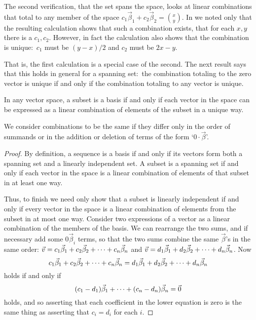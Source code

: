 The second verification, that the set spans the space, 
looks at linear combinations that total to any
member of the space
$c_1\vec{\beta}_1+c_2\vec{\beta}_2=\binom{x}{y}$.
In  we noted only that 
the resulting calculation shows that such a combination 
exists, that for each $x,y$ there is a $c_1,c_2$.
However, in fact the calculation also shows that the combination is 
unique:~$c_1$ must be $(y-x)/2$ and $c_2$ must be $2x-y$.

That is, the first calculation is a special case of the second.
The next result says that this holds in general for a spanning set:~the
combination totaling to the zero vector is unique if and only if the 
combination totaling to any vector is unique.
 
\begin{theorem}
\label{th:BasisIffUniqueRepWRT}
In any vector space, a subset is a basis
if and only if each vector in the
space can be expressed as a linear combination of elements of the subset 
in a unique way.
\end{theorem}

\noindent We consider combinations to be the same if they differ 
only in the order of
summands or in the addition or deletion of terms of the form 
`\( 0\cdot\vec{\beta} \)'.


\begin{proof}
By definition, a sequence is a basis if and only if its vectors form both
a spanning set and a linearly independent set.
A subset is a spanning set if and only if each vector in the space is a linear
combination of elements of that subset in at least one way.

Thus, to finish we need only show 
that a subset is linearly independent if and only if every vector in the space
is a linear combination of elements from the subset in at most one way.
Consider two expressions of a vector as a linear combination of the
members of the basis.
We can rearrange the two sums, and if necessary
add some \( 0\vec{\beta}_i \) terms, so that the two sums
combine the same \( \vec{\beta} \)'s in the same order:
\( \vec{v}=c_1\vec{\beta}_1+c_2\vec{\beta}_2+\cdots +c_n\vec{\beta}_n \) and 
\( \vec{v}=d_1\vec{\beta}_1+d_2\vec{\beta}_2+\cdots +d_n\vec{\beta}_n \). 
Now
\begin{equation*}
   c_1\vec{\beta}_1+c_2\vec{\beta}_2+\cdots +c_n\vec{\beta}_n=d_1\vec{\beta}_1+d_2\vec{\beta}_2+\cdots +d_n\vec{\beta}_n
\end{equation*}
holds if and only if
\begin{equation*}
   (c_1-d_1)\vec{\beta}_1+\dots+(c_n-d_n)\vec{\beta}_n=\vec{0}
\end{equation*}
holds, and so asserting that 
each coefficient in the lower equation is zero is 
the same thing as asserting that \( c_i=d_i \) for each \( i \).
\end{proof}

